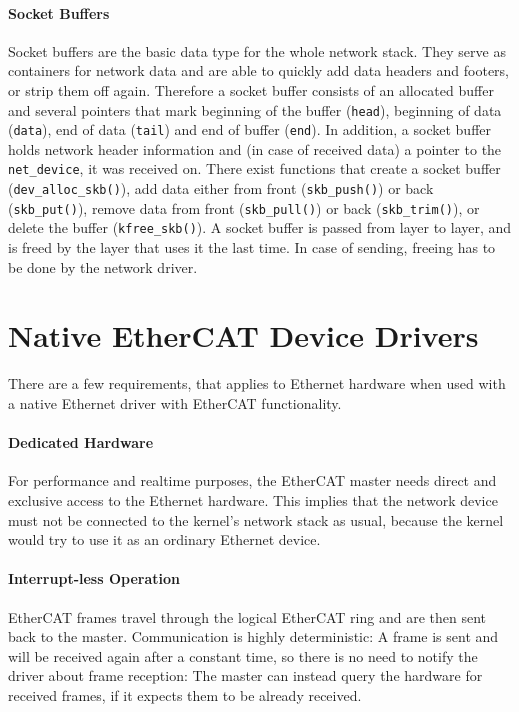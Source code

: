 \documentclass[a4paper,12pt,BCOR6mm,bibtotoc,idxtotoc]{scrbook}
\begin{document}
\paragraph{Socket Buffers} Socket buffers are the basic
data type for the whole network stack. They serve as containers for network
data and are able to quickly add data headers and footers, or strip them off
again. Therefore a socket buffer consists of an allocated buffer and several
pointers that mark beginning of the buffer (\lstinline+head+), beginning of
data (\lstinline+data+), end of data (\lstinline+tail+) and end of buffer
(\lstinline+end+). In addition, a socket buffer holds network header
information and (in case of received data) a pointer to the
\lstinline+net_device+, it was received on. There exist functions that create
a socket buffer (\lstinline+dev_alloc_skb()+), add data either from front
(\lstinline+skb_push()+) or back (\lstinline+skb_put()+), remove data from
front (\lstinline+skb_pull()+) or back (\lstinline+skb_trim()+), or delete the
buffer (\lstinline+kfree_skb()+).  A socket buffer is passed from layer to
layer, and is freed by the layer that uses it the last time. In case of
sending, freeing has to be done by the network driver.


\section{Native EtherCAT Device Drivers}
\label{sec:native-drivers}

There are a few requirements, that applies to Ethernet hardware when used with
a native Ethernet driver with EtherCAT functionality.

\paragraph{Dedicated Hardware} For performance and realtime purposes, the
EtherCAT master needs direct and exclusive access to the Ethernet hardware.
This implies that the network device must not be connected to the kernel's
network stack as usual, because the kernel would try to use it as an ordinary
Ethernet device.

\paragraph{Interrupt-less Operation} EtherCAT frames travel
through the logical EtherCAT ring and are then sent back to the master.
Communication is highly deterministic: A frame is sent and will be received
again after a constant time, so there is no need to notify the driver about
frame reception: The master can instead query the hardware for received
frames, if it expects them to be already received.
\end{document}
